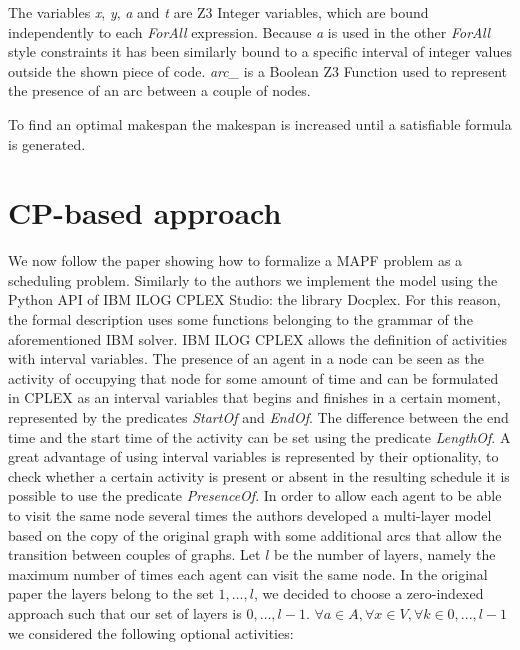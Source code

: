 \documentclass[12pt, a4paper, hidelinks]{article}
\numberwithin{equation}{section}
\begin{document}
The variables \textit{x}, \textit{y}, \textit{a} and \textit{t} are Z3 Integer variables, which are bound independently to each \textit{ForAll} expression.
Because \textit{a} is used in the other \textit{ForAll} style constraints it has been similarly bound to a specific interval of integer values outside the shown piece of code.
\textit{arc\_} is a Boolean Z3 Function used to represent the presence of an arc between a couple of nodes.

To find an optimal makespan the makespan is increased until a satisfiable formula is generated.

\section{CP-based approach}\label{sec:cp-based-approach}

We now follow the paper showing how to formalize a MAPF problem as a scheduling problem.
Similarly to the authors we implement the model using the Python API of IBM ILOG CPLEX Studio: the library Docplex.
For this reason, the formal description uses some functions belonging to the grammar of the aforementioned IBM solver.
IBM ILOG CPLEX allows the definition of activities with interval variables.
The presence of an agent in a node can be seen as the activity of occupying that node for some amount of time and can be formulated in CPLEX as an interval variables that begins and finishes in a certain moment, represented by the predicates \textit{StartOf} and \textit{EndOf}.
The difference between the end time and the start time of the activity can be set using the predicate \textit{LengthOf}.
A great advantage of using interval variables is represented by their optionality, to check whether a certain activity is present or absent in the resulting schedule it is possible to use the predicate \textit{PresenceOf}.
In order to allow each agent to be able to visit the same node several times the authors developed a multi-layer model based on the copy of the original graph with some additional arcs that allow the transition between couples of graphs.
Let $l$ be the number of layers, namely the maximum number of times each agent can visit the same node.
In the original paper the layers belong to the set ${1,\dots,l}$, we decided to choose a zero-indexed approach such that our set of layers is ${0,\dots,l-1}$.
$\forall a \in A, \forall x \in V, \forall k \in {0,...,l-1}$ we considered the following optional activities:
\end{document}
